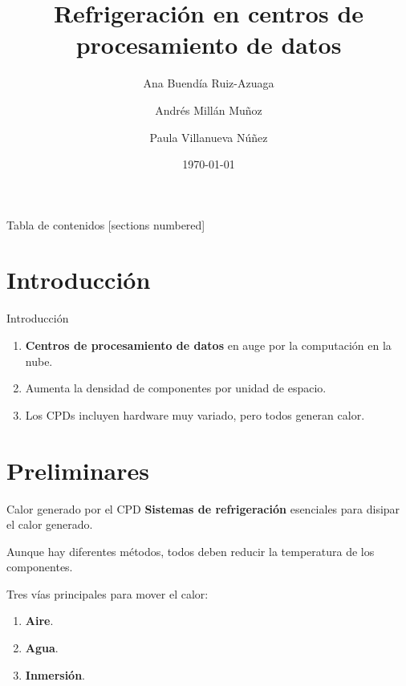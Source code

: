 \documentclass[aspectratio=169, compress]{beamer}
\title{Refrigeración en centros de procesamiento de datos}
\date{\today}
\author{Ana Buendía Ruiz-Azuaga \and Andrés Millán Muñoz \and Paula Villanueva Núñez}
\institute{Universidad de Granada}
\begin{document}
\maketitle

\begin{frame}{Tabla de contenidos}
    [sections numbered]
    \tableofcontents
\end{frame}




\section{Introducción}    

\begin{frame}{Introducción}
    \begin{enumerate}
        \item \textbf{Centros de procesamiento de datos} en auge por la computación en la nube.
        \item Aumenta la densidad de componentes por unidad de espacio.
        \item Los CPDs incluyen hardware muy variado, pero todos generan calor.
    \end{enumerate}    
\end{frame}




\section{Preliminares}

\begin{frame}{Calor generado por el CPD}
    \textbf{Sistemas de refrigeración} esenciales para disipar el calor generado. 
        
    Aunque hay diferentes métodos, todos deben reducir la temperatura de los componentes. 

    Tres vías principales para mover el calor:

    \begin{enumerate}
        \item \textbf{Aire}.
        \item \textbf{Agua}.
        \item \textbf{Inmersión}.
    \end{enumerate}
\end{frame}
\end{document}

